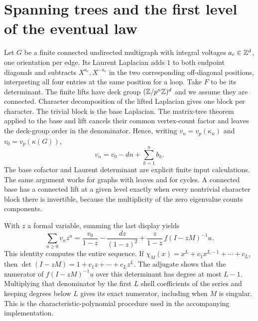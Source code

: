 \section{Spanning trees and the first level of the eventual law}
\label{sec:exact-gf}

Let $G$ be a finite connected undirected multigraph with integral
voltages $a_e\in\mathbb Z^d$, one orientation per edge. Its Laurent Laplacian
adds $1$ to both endpoint diagonals and subtracts $X^{a_e},X^{-a_e}$
in the two corresponding off-diagonal positions, interpreting all four
entries at the same position for a loop. Take $F$ to be its determinant.
The finite lifts have deck group $(\mathbb Z/p^n\mathbb Z)^d$ and we assume they
are connected. Character decomposition of the lifted Laplacian
gives one block per character. The trivial block is the base Laplacian.
The matrix-tree theorem applied to the base and lift cancels their
common vertex-count factor and leaves the deck-group order in the
denominator. Hence, writing $v_n=v_p(\kappa_n)$ and
$v_0=v_p(\kappa(G))$,
\[
 v_n=v_0-dn+\sum_{h=1}^n b_h .
\]
The base cofactor and Laurent determinant are explicit finite input
calculations. The same argument works for graphs with leaves and for
cycles. A connected base has a connected lift at a given level exactly
when every nontrivial character block there is invertible, because
the multiplicity of the zero eigenvalue counts components.

With $z$ a formal variable, summing the last display yields
\begin{equation}
 \sum_{n\ge0}v_n z^n=
 \frac{v_0}{1-z}-\frac{dz}{(1-z)^2}
 +\frac{z}{1-z}\,f(I-zM)^{-1}u .
 \label{eq:machine-resolvent}
\end{equation}
This identity computes the entire sequence. If
$\chi_M(x)=x^L+c_1x^{L-1}+\cdots+c_L$, then
$\det(I-zM)=1+c_1z+\cdots+c_Lz^L$. The adjugate shows that the
numerator of $f(I-zM)^{-1}u$ over this determinant has degree at most
$L-1$. Multiplying that denominator by the first $L$ shell coefficients
of the series and keeping degrees below $L$ gives its exact numerator,
including when $M$ is singular. This is the characteristic-polynomial
procedure used in the accompanying implementation.


